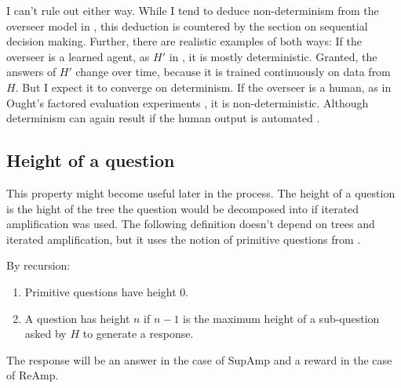 \documentclass{farlamp}
\begin{document}
I can't rule out either way. While I tend to deduce non-determinism from the
overseer model in \textcite{ChriRelAmp}, this deduction is countered by the
section on sequential decision making. Further, there are realistic examples of
both ways: If the overseer is a learned agent, as $H'$ in \textcite{CSASupAmp},
it is mostly deterministic. Granted, the answers of $H'$ change over time,
because it is trained continuously on data from $H$. But I expect it to converge
on determinism. If the overseer is a human, as in Ought's factored evaluation
experiments \parencite{StuhDelCog}, it is non-deterministic. Although
determinism can again result if the human output is automated
\parencite[see][sec. ‘Caching’ f.]{StuhTaxCapAmp}.

%
%
%
%


\subsection{Height of a question}

This property might become useful later in the process. The height of a
question is the hight of the tree the question would be decomposed into if
iterated amplification was used. The following definition doesn't depend on
trees and iterated amplification, but it uses the notion of primitive questions
from \textcite[app. C]{CSASupAmp}.

\begin{definition} By recursion:
    \begin{enumerate}
    \item Primitive questions have height 0.
    \item A question has height $n$ if $n-1$ is the maximum height of a
        sub-question asked by $H$ to generate a response.
    \end{enumerate}
The response will be an answer in the case of SupAmp and a reward in the case of
ReAmp.
\end{definition}
\end{document}
